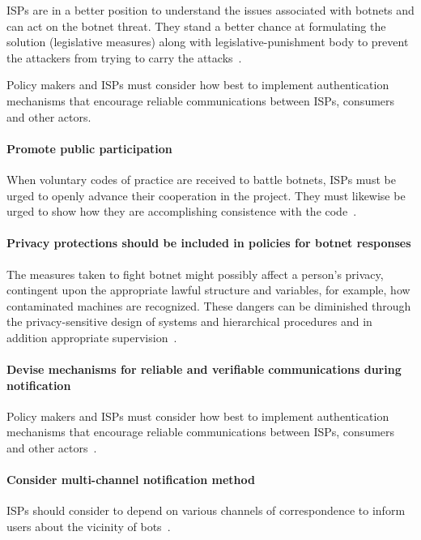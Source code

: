 ISPs are in a better position to understand the issues associated with botnets and can act on the botnet threat. They stand a better chance at formulating the solution (legislative measures) along with legislative-punishment body to prevent the attackers from trying to carry the attacks~\cite{stankovic2009defense}.


Policy makers and ISPs must consider how best to implement authentication mechanisms that encourage reliable communications between ISPs, consumers and other actors.




\paragraph{Promote public participation}
When voluntary codes of practice are received to battle botnets, ISPs must be urged to openly advance their cooperation in the project. They must likewise be urged to show how they are accomplishing consistence with the code~\cite{OECD}.


\paragraph{Privacy protections should be included in policies for botnet responses}
The measures taken to fight botnet might possibly affect a person’s privacy, contingent upon the appropriate lawful structure and variables, for example, how contaminated machines are recognized. These dangers can be diminished through the privacy-sensitive design of systems and hierarchical procedures and in addition appropriate supervision~\cite{OECD}.


\paragraph{Devise mechanisms for reliable and verifiable communications during notification}
Policy makers and ISPs must consider how best to implement authentication mechanisms that encourage reliable communications between ISPs, consumers and other actors~\cite{OECD}. 

\paragraph{Consider multi-channel notification method}
ISPs should consider to depend on various channels of correspondence to inform users about the vicinity of bots~\cite{OECD}.

